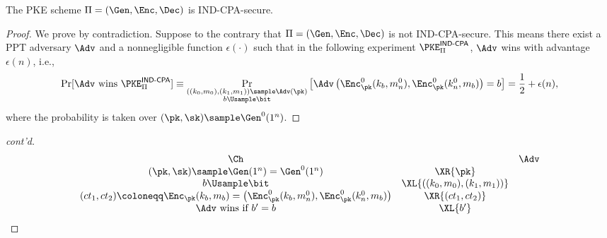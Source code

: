 \begin{answer}
    \begin{claim}\label{claim:p1-2}
        The PKE scheme $\Pi=(\Gen, \Enc, \Dec)$ is IND-CPA-secure.
    \end{claim}
    \begin{proof}
        We prove by contradiction. Suppose to the contrary that  $\Pi=(\Gen, \Enc, \Dec)$ is not IND-CPA-secure. This means there exist a PPT adversary $\Adv$ and a nonnegligible function $\epsilon(\cdot)$ such that in the following experiment $\PKE^{\textsf{IND-CPA}}_{\Pi}$, $\Adv$ wins with advantage $\epsilon(n)$, i.e., 
        \begin{equation}\label{eq:p1-2}
            \Pr[\Adv \textrm{ wins } \PKE^{\textsf{IND-CPA}}_{\Pi}] 
            \equiv \Pr_{\substack{((k_0, m_0), (k_1, m_1))\sample \Adv(\pk)\\b\Usample\bit}}\left[\Adv\left(\Enc^0_\pk(k_b, m_n^0),\Enc^0_\pk(k_n^0, m_b)\right) = b\right]
            = \dfrac{1}{2}+\epsilon(n),
        \end{equation}
        where the probability is taken over $(\pk, \sk)\sample\Gen^0(1^n)$.
        \end{proof}\begin{proof}[cont'd]
        {
            \[
                \begin{array}{@{} c c c @{}}
                \Ch & & \Adv \\
                (\pk, \sk)\sample \Gen(1^n)=\Gen^0(1^n) & \XR{\pk}  &\\
                b\Usample \bit& \XL{((k_0, m_0), (k_1, m_1))} &\\
                (ct_1, ct_2)\coloneqq \Enc_\pk(k_b, m_b) = \left(\Enc^0_\pk(k_b, m_n^0),\Enc^0_\pk(k_n^0, m_b)\right) & \XR{(ct_1, ct_2)} &\\
                \textrm{$\Adv$ wins if $b'=b$} & \XL{b'} & \\
                \end{array}
            \]
            \vspace{-0.8cm}
            \label{fig:p1-game1}
        }


\end{proof}
\end{answer}
